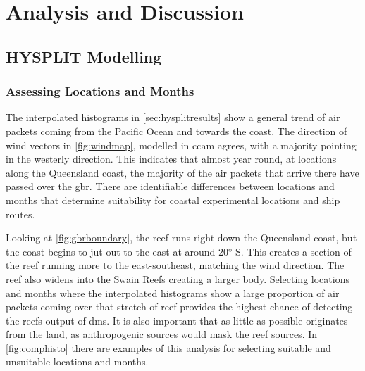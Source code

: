 \chapter{Analysis and Discussion}
\label{ch:analdisc}

\section{HYSPLIT Modelling}
\label{sec:hysplitwork}

	\subsection{Assessing Locations and Months}
	\label{subsec:asslocs}

	The interpolated histograms in \cref{sec:hysplitresults} show a general trend of air packets coming from the Pacific Ocean and towards the coast. The direction of wind vectors in \cref{fig:windmap}, modelled in \gls{ccam} agrees, with a majority pointing in the westerly direction. This indicates that almost year round, at locations along the Queensland coast, the majority of the air packets that arrive there have passed over the \gls{gbr}. There are identifiable differences between locations and months that determine suitability for coastal experimental locations and ship routes.

	Looking at \cref{fig:gbrboundary}, the reef runs right down the Queensland coast, but the coast begins to jut out to the east at around \ang{20} S. This creates a section of the reef running more to the east-southeast, matching the wind direction. The reef also widens into the Swain Reefs creating a larger body. Selecting locations and months where the interpolated histograms show a large proportion of air packets coming over that stretch of reef provides the highest chance of detecting the reefs output of \gls{dms}. It is also important that as little as possible originates from the land, as anthropogenic sources would mask the reef sources. In \cref{fig:comphisto} there are examples of this analysis for selecting suitable and unsuitable locations and months.

